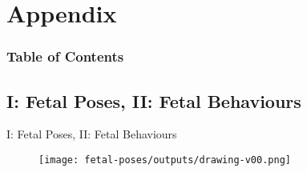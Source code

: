 \section{Appendix}

\begin{frame}
  \frametitle{Table of Contents}
  \tableofcontents[currentsection]
\end{frame}


\subsection{I: Fetal Poses, II: Fetal Behaviours}

{
\begin{frame}{I: Fetal Poses, II: Fetal Behaviours}
      \begin{figure}
        \centering
        \texttt{[image: fetal-poses/outputs/drawing-v00.png]}
      \end{figure}
\end{frame}
}



